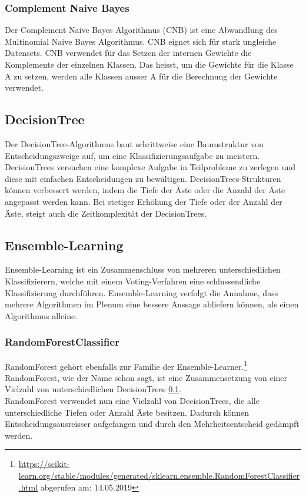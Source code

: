 \subsubsection{Complement Naive Bayes}
Der Complement Naive Bayes Algorithmus (CNB) ist eine Abwandlung des Multinomial Naive Bayes Algorithmus.
CNB eignet sich für stark ungleiche Datensets.
CNB verwendet für das Setzen der internen Gewichte die Komplemente der einzelnen Klassen.
Das heisst, um die Gewichte für die Klasse A zu setzen, werden alle Klassen ausser A für die Berechnung der Gewichte verwendet\cite{rennie2003tackling}.
\subsection{DecisionTree}\label{sec:trees}
Der DecisionTree-Algorithmus baut schrittweise eine Baumstruktur von Entscheidungszweige auf, um eine Klassifizierungsaufgabe zu meistern.
DecisionTrees versuchen eine komplexe Aufgabe in Teilprobleme zu zerlegen und diese mit einfachen Entscheidungen zu bewältigen.
DecisionTrees-Strukturen können verbessert werden, indem die Tiefe der Äste oder die Anzahl der Äste angepasst werden kann.
Bei stetiger Erhöhung der Tiefe oder der Anzahl der Äste, steigt auch die Zeitkomplexität der DecisionTrees\cite{safavian1991survey}.
\subsection{Ensemble-Learning}
Ensemble-Learning ist ein Zusammenschluss von mehreren unterschiedlichen Klassifizierern, welche mit einem Voting-Verfahren eine schlussendliche Klassifizierung durchführen.
Ensemble-Learning verfolgt die Annahme, dass mehrere Algorithmen im Plenum eine bessere Aussage abliefern können, als einen Algorithmus alleine\cite{freund1999short}.
\subsubsection{RandomForestClassifier}
RandomForest gehört ebenfalls zur Familie der Ensemble-Learner.\footnote{\url{https://scikit-learn.org/stable/modules/generated/sklearn.ensemble.RandomForestClassifier.html} abgerufen am: 14.05.2019}
RandomForest, wie der Name schon sagt, ist eine Zusammensetzung von einer Vielzahl von unterschiedlichen DecisionTrees \cref{sec:trees}.\\
RandomForest verwendet nun eine Vielzahl von DecisionTrees, die alle unterschiedliche Tiefen oder Anzahl Äste besitzen.
Dadurch können Entscheidungsausreisser aufgefangen und durch den Mehrheitsentscheid gedämpft werden\cite{liaw2002classification}.
